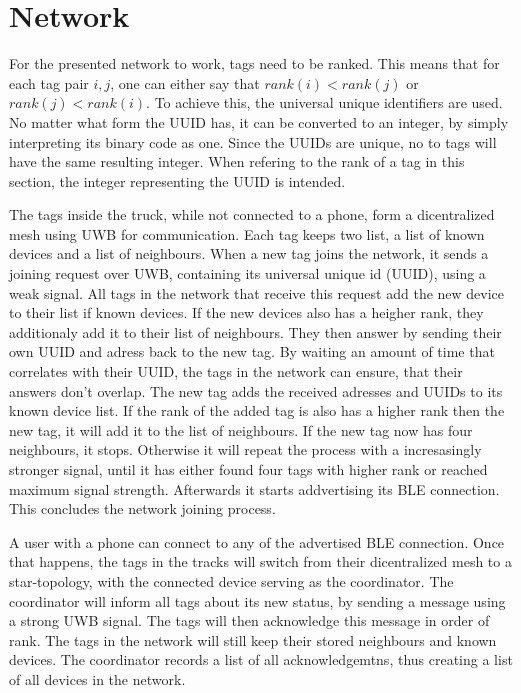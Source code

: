\section{Network}
\label{s:network}

For the presented network to work, tags need to be ranked.
This means that for each tag pair $i,j$, one can either say that $rank(i)<rank(j)$ or $rank(j)<rank(i)$.
To achieve this, the universal unique identifiers are used.
No matter what form the UUID has, it can be converted to an integer, by simply interpreting its binary code as one.
Since the UUIDs are unique, no to tags will have the same resulting integer.
When refering to the rank of a tag in this section, the integer representing the UUID is intended.

The tags inside the truck, while not connected to a phone, form a dicentralized mesh using UWB for communication.
Each tag keeps two list, a list of known devices and a list of neighbours.
When a new tag joins the network, it sends a joining request over UWB, containing its universal unique id (UUID), using a weak signal.
All tags in the network that receive this request add the new device to their list if known devices. 
If the new devices also has a heigher rank, they additionaly add it to their list of neighbours.
They then answer by sending their own UUID and adress back to the new tag.
By waiting an amount of time that correlates with their UUID, the tags in the network can ensure, that their answers don't overlap.
The new tag adds the received adresses and UUIDs to its known device list. If the rank of the added tag is also has a higher rank then the new tag, it will add it to the list of neighbours.
If the new tag now has four neighbours, it stops. Otherwise it will repeat the process with a incresasingly stronger signal, until it has either found four tags with higher rank or reached maximum signal strength.
Afterwards it starts addvertising its BLE connection.
This concludes the network joining process.


A user with a phone can connect to any of the advertised BLE connection.
Once that happens, the tags in the tracks will switch from their dicentralized mesh to a star-topology, with the connected device serving as the coordinator.
The coordinator will inform all tags about its new status, by sending a message using a strong UWB signal.
The tags will then acknowledge this message in order of rank.
The tags in the network will still keep their stored neighbours and known devices.
The coordinator records a list of all acknowledgemtns, thus creating a list of all devices in the network.


